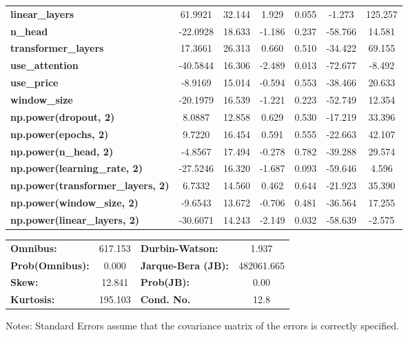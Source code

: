 \begin{center}
\begin{tabular}{lcccccc}
\textbf{linear\_layers}                   &      61.9921  &       32.144     &     1.929  &         0.055        &       -1.273    &      125.257     \\
\textbf{n\_head}                          &     -22.0928  &       18.633     &    -1.186  &         0.237        &      -58.766    &       14.581     \\
\textbf{transformer\_layers}              &      17.3661  &       26.313     &     0.660  &         0.510        &      -34.422    &       69.155     \\
\textbf{use\_attention}                   &     -40.5844  &       16.306     &    -2.489  &         0.013        &      -72.677    &       -8.492     \\
\textbf{use\_price}                       &      -8.9169  &       15.014     &    -0.594  &         0.553        &      -38.466    &       20.633     \\
\textbf{window\_size}                     &     -20.1979  &       16.539     &    -1.221  &         0.223        &      -52.749    &       12.354     \\
\textbf{np.power(dropout, 2)}             &       8.0887  &       12.858     &     0.629  &         0.530        &      -17.219    &       33.396     \\
\textbf{np.power(epochs, 2)}              &       9.7220  &       16.454     &     0.591  &         0.555        &      -22.663    &       42.107     \\
\textbf{np.power(n\_head, 2)}             &      -4.8567  &       17.494     &    -0.278  &         0.782        &      -39.288    &       29.574     \\
\textbf{np.power(learning\_rate, 2)}      &     -27.5246  &       16.320     &    -1.687  &         0.093        &      -59.646    &        4.596     \\
\textbf{np.power(transformer\_layers, 2)} &       6.7332  &       14.560     &     0.462  &         0.644        &      -21.923    &       35.390     \\
\textbf{np.power(window\_size, 2)}        &      -9.6543  &       13.672     &    -0.706  &         0.481        &      -36.564    &       17.255     \\
\textbf{np.power(linear\_layers, 2)}      &     -30.6071  &       14.243     &    -2.149  &         0.032        &      -58.639    &       -2.575     \\
\bottomrule
\end{tabular}
\begin{tabular}{lclc}
\textbf{Omnibus:}       & 617.153 & \textbf{  Durbin-Watson:     } &     1.937   \\
\textbf{Prob(Omnibus):} &   0.000 & \textbf{  Jarque-Bera (JB):  } & 482061.665  \\
\textbf{Skew:}          &  12.841 & \textbf{  Prob(JB):          } &      0.00   \\
\textbf{Kurtosis:}      & 195.103 & \textbf{  Cond. No.          } &      12.8   \\
\bottomrule
\end{tabular}
\end{center}

Notes: \newline
 [1] Standard Errors assume that the covariance matrix of the errors is correctly specified.
